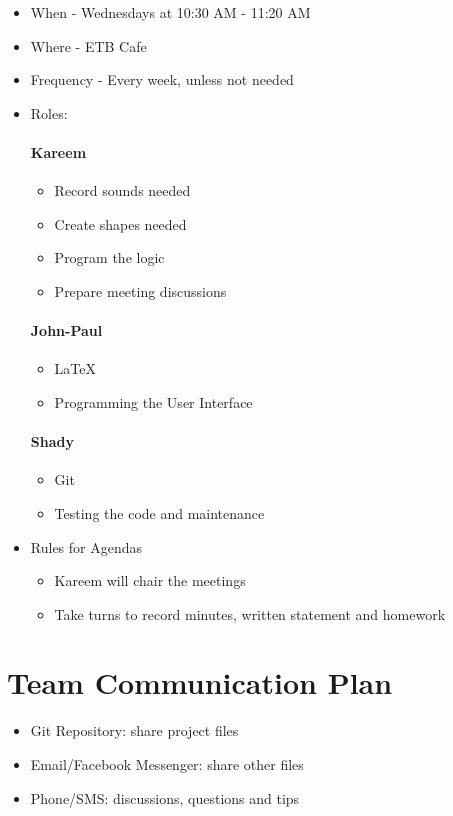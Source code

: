 \documentclass{article}
\begin{document}
\begin{itemize}
\item When - Wednesdays at 10:30 AM - 11:20 AM
\item Where - ETB Cafe
\item Frequency - Every week, unless not needed
\item Roles:

\paragraph{Kareem}
\begin{itemize}
\item Record sounds needed
\item Create shapes needed
\item Program the logic
\item Prepare meeting discussions
\end{itemize}

\paragraph{John-Paul}
\begin{itemize}
\item LaTeX
\item Programming the User Interface
\end{itemize}

\paragraph{Shady}
\begin{itemize}
\item Git
\item Testing the code and maintenance
\end{itemize}

\item Rules for Agendas
\begin{itemize}
\item Kareem will chair the meetings
\item Take turns to record minutes, written statement and homework
\end{itemize}
\end{itemize}

\section{Team Communication Plan}
\begin{itemize}
\item Git Repository: share project files
\item Email/Facebook Messenger: share other files
\item Phone/SMS: discussions, questions and tips
\end{itemize}
\end{document}
